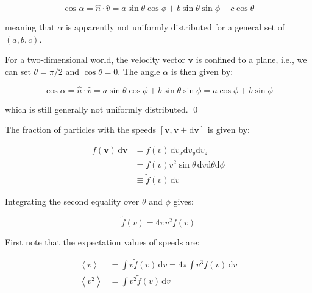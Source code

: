 \documentclass[12pt]{article}
\begin{document}
\begin{equation}
    \cos{\alpha} = \hat{n} \cdot \hat{v} = a \sin{\theta} \cos{\phi} + b \sin{\theta} \sin{\phi} + c \cos{\theta}
\end{equation}

meaning that $\alpha$ is apparently not uniformly distributed for a general set of $(a, b, c)$.

For a two-dimensional world, the velocity vector $\mathbf{v}$ is confined to a plane, i.e., we can set $\theta = \pi/2$ and $\cos{\theta} = 0$. The angle $\alpha$ is then given by:

\begin{equation}
    \cos{\alpha} = \hat{n} \cdot \hat{v} = a \sin{\theta} \cos{\phi} + b \sin{\theta} \sin{\phi} = a \cos{\phi} + b \sin{\phi}
\end{equation}

which is still generally not uniformly distributed.
\qed



The fraction of particles with the speeds $[\mathbf{v}, \mathbf{v} + \mathrm{d}\mathbf{v}]$ is given by:

\begin{equation}
    \begin{split}
        f(\mathbf{v}) \, \mathrm{d}\mathbf{v} &= f(v) \, \mathrm{d}v_{x} \mathrm{d}v_{y} \mathrm{d}v_{z} \\
        &= f(v) v^{2} \sin{\theta} \, \mathrm{d}v \mathrm{d}\theta \mathrm{d}\phi \\
        &\equiv \tilde{f}(v) \, \mathrm{d}v
    \end{split}
\end{equation}

Integrating the second equality over $\theta$ and $\phi$ gives:

\begin{equation}
    \tilde{f}(v) = 4\pi v^{2} f(v)
\end{equation}

First note that the expectation values of speeds are:

\begin{equation}
    \begin{split}
        \left\langle v \right\rangle &= \int v \tilde{f}(v) \, \mathrm{d}v = 4\pi \int v^{3} f(v) \, \mathrm{d}v \\
        \left\langle v^{2} \right\rangle &= \int v^{2} \tilde{f}(v) \, \mathrm{d}v
    \end{split}
\end{equation}
\end{document}
